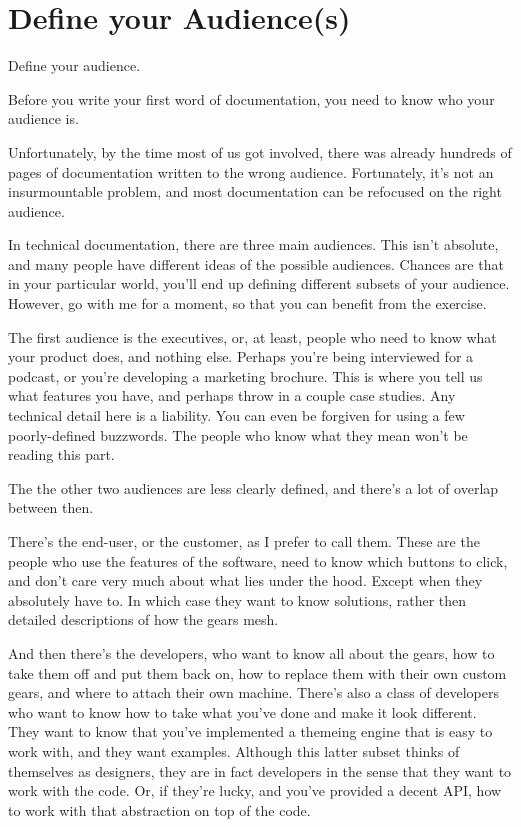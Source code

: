 \chapter{Define your Audience(s)}

Define your audience.

Before you write your first word of documentation, you need to know who
your audience is.

Unfortunately, by the time most of us got involved, there was already
hundreds of pages of documentation written to the wrong audience.
Fortunately, it's not an insurmountable problem, and most documentation
can be refocused on the right audience.

In technical documentation, there are three main audiences. This isn't
absolute, and many people have different ideas of the possible
audiences. Chances are that in your particular world, you'll end up
defining different subsets of your audience. However, go with me for a
moment, so that you can benefit from the exercise.

The first audience is the executives, or, at least, people who need to
know what your product does, and nothing else. Perhaps you're being
interviewed for a podcast, or you're developing a marketing brochure.
This is where you tell us what features you have, and perhaps throw in a
couple case studies. Any technical detail here is a liability. You can
even be forgiven for using a few poorly-defined buzzwords. The people
who know what they mean won't be reading this part.

The the other two audiences are less clearly defined, and there's a lot
of overlap between then.

There's the end-user, or the customer, as I prefer to call them. These
are the people who use the features of the software, need to know which
buttons to click, and don't care very much about what lies under the
hood. Except when they absolutely have to. In which case they want to
know solutions, rather then detailed descriptions of how the gears mesh.

And then there's the developers, who want to know all about the gears,
how to take them off and put them back on, how to replace them with
their own custom gears, and where to attach their own machine. There's
also a class of developers who want to know how to take what you've done
and make it look different. They want to know that you've implemented a
themeing engine that is easy to work with, and they want examples.
Although this latter subset thinks of themselves as designers, they are
in fact developers in the sense that they want to work with the code.
Or, if they're lucky, and you've provided a decent API, how to work with
that abstraction on top of the code.

